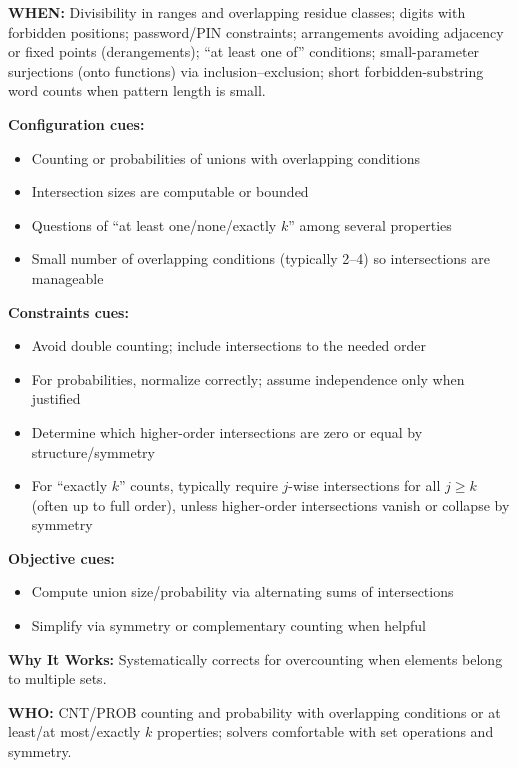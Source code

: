 \documentclass[12pt]{article}
\begin{document}
\textbf{WHEN:} Divisibility in ranges and overlapping residue classes; digits with forbidden positions; password/PIN constraints; arrangements avoiding adjacency or fixed points (derangements); ``at least one of'' conditions; small-parameter surjections (onto functions) via inclusion--exclusion; short forbidden-substring word counts when pattern length is small.

\textbf{Configuration cues:}
\begin{itemize}
    \item Counting or probabilities of unions with overlapping conditions
    \item Intersection sizes are computable or bounded
    \item Questions of ``at least one/none/exactly $k$'' among several properties
    \item Small number of overlapping conditions (typically 2--4) so intersections are manageable
\end{itemize}

\textbf{Constraints cues:}
\begin{itemize}
    \item Avoid double counting; include intersections to the needed order
    \item For probabilities, normalize correctly; assume independence only when justified
    \item Determine which higher-order intersections are zero or equal by structure/symmetry
    \item For ``exactly $k$'' counts, typically require $j$-wise intersections for all $j\ge k$ (often up to full order), unless higher-order intersections vanish or collapse by symmetry
\end{itemize}

\textbf{Objective cues:}
\begin{itemize}
    \item Compute union size/probability via alternating sums of intersections
    \item Simplify via symmetry or complementary counting when helpful
\end{itemize}

\textbf{Why It Works:} Systematically corrects for overcounting when elements belong to multiple sets.

\textbf{WHO:} CNT/PROB counting and probability with overlapping conditions or at least/at most/exactly $k$ properties; solvers comfortable with set operations and symmetry.
\end{document}
